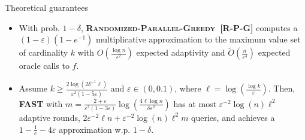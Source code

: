 \documentclass{beamer} %
\begin{document}
\begin{frame}{Theoretical guarantees}
\begin{itemize}
    \item \footnotesize
    With prob. $1-\delta$, \textsc{\textbf{Randomized-Parallel-Greedy~[R-P-G]}} computes a $(1-\varepsilon)\left(1-e^{-1}\right)$ multiplicative approximation to the maximum value set of cardinality $k$ with $O\left(\frac{\log n}{\varepsilon^{2}}\right)$ expected adaptivity and $\tilde{O}\left(\frac{n}{\varepsilon^{4}}\right)$ expected oracle calls to $f$.
    \vspace{5pt}
    \item  \footnotesize
    Assume $k \geq \frac{2 \log(2\delta^{-1} \ell)}{\varepsilon^2 (1 - 5\varepsilon)}$ and $\varepsilon \in (0, 0.1)$, where  $\ell = \log(\frac{\log k}{\varepsilon})$. Then, \textsc{\textbf{FAST}} with $m = \frac{2 + \varepsilon}{\varepsilon^2(1 -  3\varepsilon)} \log(\frac{4\ell\log n}{\delta \varepsilon^2})$ has at most $\varepsilon^{-2} \log(n)  \ell^2$  adaptive rounds,    $2\varepsilon^{-2}  \ell n +  \varepsilon^{-2} \log(n) \ell^2 m$ queries, and achieves a $1 - \frac{1}{e} - 4 \varepsilon$ approximation w.p. $1 - \delta$.
\end{itemize}




\end{frame}
\end{document}
